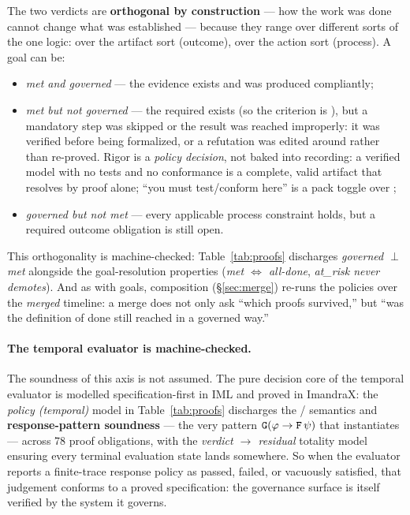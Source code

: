 The two verdicts are \textbf{orthogonal by construction} --- how the work was
done cannot change what was established --- because they range over different
sorts of the one logic:  over the artifact sort (outcome), 
over the action sort (process). A goal can be:
\begin{itemize}
\item \emph{met and governed} --- the evidence exists and was produced compliantly;
\item \emph{met but not governed} --- the required 
exists (so the criterion is ), but a mandatory step was skipped or the
result was reached improperly: it was verified before being formalized, or a
refutation was edited around rather than re-proved. Rigor is a \emph{policy
decision}, not baked into recording: a verified model with no tests and no
conformance is a complete, valid artifact that resolves  by proof
alone; ``you must test/conform here'' is a pack toggle over
;
\item \emph{governed but not met} --- every applicable process constraint holds,
but a required outcome obligation is still open.
\end{itemize}
This orthogonality is machine-checked: Table~\ref{tab:proofs} discharges
\emph{governed \(\perp\) met} alongside the goal-resolution properties (\emph{met
\(\Leftrightarrow\) all-done}, \emph{at\_risk never demotes}). And as with goals,
composition (\S\ref{sec:merge}) re-runs the policies over the \emph{merged}
timeline: a merge does not only ask ``which proofs survived,'' but ``was the
definition of done still reached in a governed way.''

\paragraph{The temporal evaluator is machine-checked.}
The soundness of this axis is not assumed. The pure decision core of the temporal
evaluator is modelled specification-first in IML and proved in ImandraX: the
\emph{policy (temporal)} model in Table~\ref{tab:proofs} discharges the
/ semantics and \textbf{response-pattern soundness} --- the very
pattern \(\code{G}(\varphi \to \code{F}\,\psi)\) that
 instantiates --- across 78 proof
obligations, with the \emph{verdict \(\to\) residual} totality model ensuring
every terminal evaluation state lands somewhere. So when the evaluator reports a
finite-trace response policy as passed, failed, or vacuously satisfied, that
judgement conforms to a proved specification: the governance surface is itself
verified by the system it governs.
